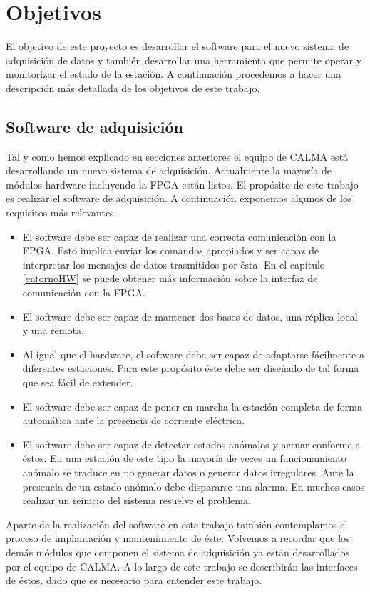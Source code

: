 \section{Objetivos}
	El objetivo de este proyecto es desarrollar el software para el nuevo sistema de adquisición de datos y también desarrollar una herramienta
	que permite operar y monitorizar el estado de la estación. A continuación procedemos a hacer una descripción más detallada de los objetivos de
	este trabajo.  
	\subsection{Software de adquisición}
		Tal y como hemos explicado en secciones anteriores el equipo de CALMA está desarrollando un nuevo sistema de adquisición. Actualmente
		la mayoría de módulos hardware incluyendo la FPGA están listos. El propósito de este trabajo es realizar el software de adquisición. A
		continuación exponemos algunos de los requisitos más relevantes.
		\begin{itemize}
			\item 	El software debe ser capaz de realizar una correcta comunicación con la FPGA. Esto implica enviar los comandos
				apropiados y ser capaz de interpretar los mensajes de datos trasmitidos por ésta. En el capítulo \ref{entornoHW} se
				puede obtener más información sobre la interfaz de comunicación con la FPGA.
			\item 	El software debe ser capaz de mantener dos bases de datos, una réplica local y una remota.
			\item 	Al igual que el hardware, el software debe ser capaz de adaptarse fácilmente a diferentes estaciones. Para este
				propósito éste debe ser diseñado de tal forma que sea fácil de extender.
			\item 	El software debe ser capaz de poner en marcha la estación completa de forma automática ante la presencia de corriente
			  	eléctrica. 
			\item 	El software debe ser capaz de detectar estados anómalos y actuar conforme a éstos. En una estación de este tipo la
				mayoría de veces un funcionamiento anómalo se traduce en no generar datos o generar datos irregulares. Ante la
				presencia de un estado anómalo debe dispararse una alarma. En muchos casos realizar un reinicio del sistema resuelve el
				problema.
		\end{itemize}
		Aparte de la realización del software en este trabajo también contemplamos el proceso de implantación y mantenimiento de éste.
		Volvemos a recordar que los demás módulos que componen el sistema de adquisición ya están desarrollados por el equipo de CALMA. A lo largo
		de este trabajo se describirán las interfaces de éstos, dado que es necesario para entender este trabajo.
